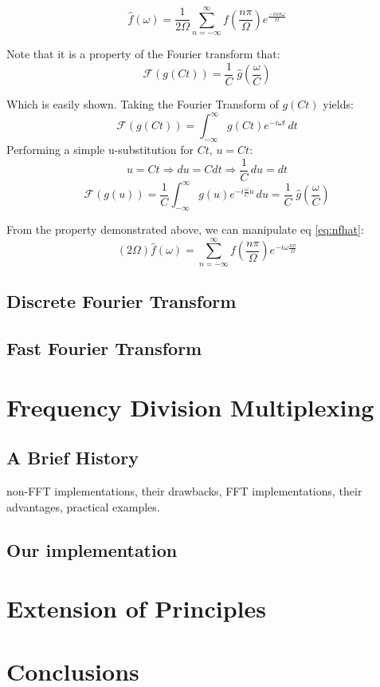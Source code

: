 \documentclass[12pt]{article}
\newcommand{\inftyint}{\int_{-\infty}^{\infty}}
\begin{document}
\[  \hat{f}(\omega)  =\frac{1}{2\Omega}  \sum_{n = -\infty}^{\infty}
f(\frac{n\pi}{\Omega})e^{\frac{-i n \pi \omega}{\Omega}} \]

Note that it is a property of the Fourier transform that: \[ \mathcal{F}(g(Ct))
= \frac{1}{C} \; \hat{g}(\frac{\omega}{C}) \]

Which is easily shown. Taking the Fourier Transform of \(g(Ct)\) yields: \[
\mathcal{F}(g(Ct)) = \inftyint g(Ct)e^{-i\omega t} \,dt \] Performing a simple
u-substitution for \(Ct\), \(u = Ct\): \[u = Ct  \Rightarrow du = Cdt
\Rightarrow \frac{1}{C} \, du = dt \] \[ \mathcal{F}(g(u)) = \frac{1}{C}
\inftyint g(u)e^{-i\frac{\omega}{C} u} \,du = \frac{1}{C} \;
\hat{g}(\frac{\omega}{C}) \]

From the property demonstrated above, we can manipulate eq \eqref{eq:nfhat}: \[
(2\Omega) \hat{f}(\omega) =  \sum_{n = -\infty}^{\infty}
f(\frac{n\pi}{\Omega})e^{-i \omega \frac{n \pi}{\Omega} } \]



\subsection{Discrete Fourier Transform}

\subsection{Fast Fourier Transform}


\section{Frequency Division Multiplexing}

\subsection{A Brief History}

non-FFT implementations, their drawbacks, FFT implementations, their
advantages, practical examples.

\subsection{Our implementation}

\section{Extension of Principles}

\section{Conclusions}
\end{document}
